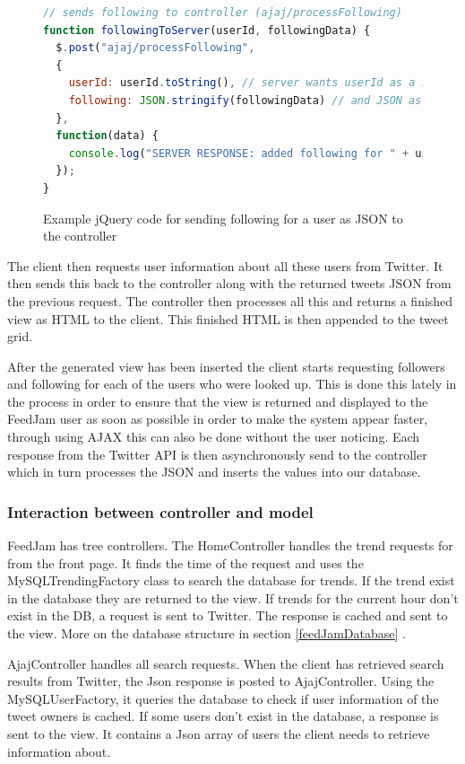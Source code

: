 \begin{figure}[h!]
\begin{lstlisting}[language=javascript]
// sends following to controller (ajaj/processFollowing)
function followingToServer(userId, followingData) {
  $.post("ajaj/processFollowing", 
  { 
    userId: userId.toString(), // server wants userId as a string
    following: JSON.stringify(followingData) // and JSON as a string
  },
  function(data) {
    console.log("SERVER RESPONSE: added following for " + userId);
  });
}
\end{lstlisting}
\caption{Example jQuery code for sending following for a user as JSON to the controller}
\label{ajaxRequest}
\end{figure}

The client then requests user information about all these users from Twitter. It then sends this back to the controller along with the returned tweets JSON from the previous request. The controller then processes all this and returns a finished view as HTML to the client. This finished HTML is then appended to the tweet grid.

After the generated view has been inserted the client starts requesting followers and following for each of the users who were looked up. This is done this lately in the process in order to ensure that the view is returned and displayed to the FeedJam user as soon as possible in order to make the system appear faster, through using AJAX this can also be done without the user noticing. Each response from the Twitter API is then asynchronously send to the controller which in turn processes the JSON and inserts the values into our database.

\subsubsection{Interaction between controller and model} %
\label{interactionControllerModel}
FeedJam has tree controllers. The HomeController handles the trend requests for from the front page. It finds the time of the request and uses the MySQLTrendingFactory class to search the database for trends. If the trend exist in the database they are returned to the view. If trends for the current hour don't exist in the DB, a request is sent to Twitter. The response is cached and sent to the view. More on the database structure in section \ref{feedJamDatabase} .

AjajController handles all search requests. When the client has retrieved search results from Twitter, the Json response is posted to AjajController. Using the MySQLUserFactory, it queries the database to check if user information of the tweet owners is cached. If some users don't exist in the database, a response is sent to the view. It contains a Json array of users the client needs to retrieve information about. 

